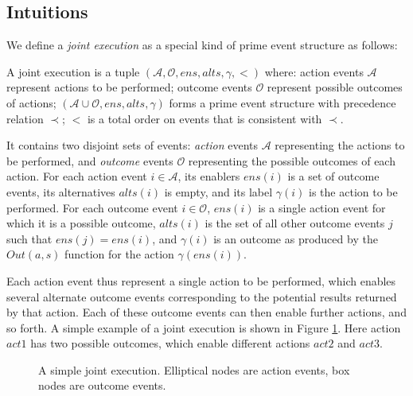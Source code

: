 \subsection{Intuitions}

We define a \emph{joint execution} as a special kind of prime event
structure as follows:

\begin{defnL}
 A joint execution is a tuple $(\mathcal{A},\mathcal{O},ens,alts,\gamma,<)$
where: action events $\mathcal{A}$ represent actions to be performed;
outcome events $\mathcal{O}$ represent possible outcomes of actions;
$(\mathcal{A}\cup\mathcal{O},ens,alts,\gamma)$ forms a prime event
structure with precedence relation $\prec$; $<$ is a total order
on events that is consistent with $\prec$. 
\end{defnL}
It contains two disjoint sets of events: \emph{action} events $\mathcal{A}$
representing the actions to be performed, and \emph{outcome} events
$\mathcal{O}$ representing the possible outcomes of each action.
For each action event $i\in\mathcal{A}$, its enablers $ens(i)$ is
a set of outcome events, its alternatives $alts(i)$ is empty, and
its label $\gamma(i)$ is the action to be performed. For each outcome
event $i\in\mathcal{O}$, $ens(i)$ is a single action event for which
it is a possible outcome, $alts(i)$ is the set of all other outcome
events $j$ such that $ens(j)=ens(i)$, and $\gamma(i)$ is an outcome
as produced by the $Out(a,s)$ function for the action $\gamma(ens(i))$.

Each action event thus represent a single action to be performed,
which enables several alternate outcome events corresponding to the
potential results returned by that action. Each of these outcome events
can then enable further actions, and so forth. A simple example of
a joint execution is shown in Figure \ref{fig:example-je}. Here action
$act1$ has two possible outcomes, which enable different actions
$act2$ and $act3$.

%
\begin{figure}

\caption{ A simple joint execution. Elliptical nodes are action events, box
nodes are outcome events. }


\label{fig:example-je} 
\end{figure}


